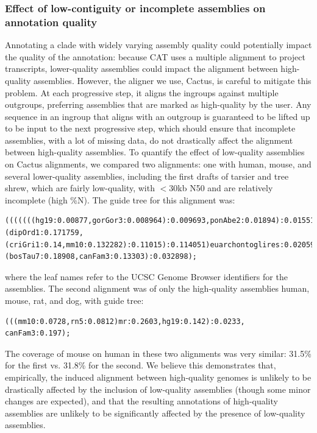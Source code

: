 \subsubsection*{Effect of low-contiguity or incomplete assemblies on annotation quality}
Annotating a clade with widely varying assembly quality could potentially impact the quality of the annotation: because CAT uses a multiple alignment to project transcripts, lower-quality assemblies could impact the alignment between high-quality assemblies. However, the aligner we use, Cactus, is careful to mitigate this problem. At each progressive step, it aligns the ingroups against multiple outgroups, preferring assemblies that are marked as high-quality by the user. Any sequence in an ingroup that aligns with an outgroup is guaranteed to be lifted up to be input to the next progressive step, which should ensure that incomplete assemblies, with a lot of missing data, do not drastically affect the alignment between high-quality assemblies. To quantify the effect of low-quality assemblies on Cactus alignments, we compared two alignments: one with human, mouse, and several lower-quality assemblies, including the first drafts of tarsier and tree shrew, which are fairly low-quality, with $<$30kb N50 and are relatively incomplete (high \%N). The guide tree for this alignment was:
\begin{lstlisting}
(((((((hg19:0.00877,gorGor3:0.008964):0.009693,ponAbe2:0.01894):0.015511,rheMac3:0.037601):0.07392,tarSyr1:0.1114):0.034014,tupChi1:0.19114):0.002,(dipOrd1:0.171759,(criGri1:0.14,mm10:0.132282):0.11015):0.114051)euarchontoglires:0.020593,(bosTau7:0.18908,canFam3:0.13303):0.032898);
\end{lstlisting}
where the leaf names refer to the UCSC Genome Browser identifiers for the assemblies. The second alignment was of only the high-quality assemblies human, mouse, rat, and dog, with guide tree:
\begin{lstlisting}
(((mm10:0.0728,rn5:0.0812)mr:0.2603,hg19:0.142):0.0233, canFam3:0.197);
\end{lstlisting}
The coverage of mouse on human in these two alignments was very similar: 31.5\% for the first vs. 31.8\% for the second. We believe this demonstrates that, empirically, the induced alignment between high-quality genomes is unlikely to be drastically affected by the inclusion of low-quality assemblies (though some minor changes are expected), and that the resulting annotations of high-quality assemblies are unlikely to be significantly affected by the presence of low-quality assemblies.

